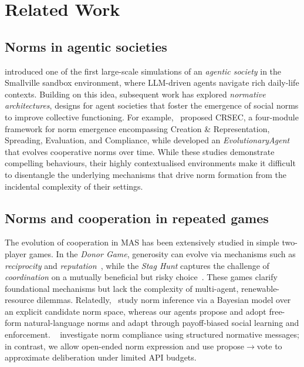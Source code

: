 \documentclass[sigconf]{aamas}
\begin{document}
\section{Related Work}

\subsection{Norms in agentic societies}

\citet{park2023generative} introduced one of the first large-scale simulations of an \emph{agentic society} in the Smallville sandbox environment, where LLM-driven agents navigate rich daily-life contexts. 
Building on this idea, subsequent work has explored \emph{normative architectures}, designs for agent societies that foster the emergence of social norms to improve collective functioning. 
For example,~\citet{ren2024emergence} proposed CRSEC, a four-module framework for norm emergence encompassing Creation \& Representation, Spreading, Evaluation, and Compliance, while \cite{li2024agent} developed an \emph{EvolutionaryAgent} that evolves cooperative norms over time. 
While these studies demonstrate compelling behaviours, their highly contextualised environments make it difficult to disentangle the underlying mechanisms that drive norm formation from the incidental complexity of their settings.

\subsection{Norms and cooperation in repeated games}

The evolution of cooperation in MAS has been extensively studied in simple two-player games. 
In the \textit{Donor Game}, generosity can evolve via mechanisms such as \textit{reciprocity} and \textit{reputation}~\cite{vallinder2024cultural}, while the \textit{Stag Hunt} captures the challenge of \textit{coordination} on a mutually beneficial but risky choice~\cite{liucooperative}. 
These games clarify foundational mechanisms but lack the complexity of multi-agent, renewable-resource dilemmas.
Relatedly,~\citet{oldenburg2024learning} study norm inference via a Bayesian model over an explicit candidate norm space, whereas our agents propose and adopt free-form natural-language norms and adapt through payoff-biased social learning and enforcement.
~\citet{tzeng2024norm} investigate norm compliance using structured normative messages; in contrast, we allow open-ended norm expression and use propose$\to$vote to approximate deliberation under limited API budgets.
\end{document}
